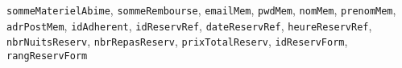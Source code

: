 \documentclass[12pt, a4paper]{article}
\newcommand\att[1]{\textnhtt{#1}}
\begin{document}
\att{sommeMaterielAbime},
\att{sommeRembourse},
\att{emailMem}, %
\att{pwdMem}, %
\att{nomMem}, %
\att{prenomMem}, %
\att{adrPostMem}, %
\att{idAdherent}, %
\att{idReservRef}, %
\att{dateReservRef}, %
\att{heureReservRef}, %
\att{nbrNuitsReserv}, %
\att{nbrRepasReserv}, %
\att{prixTotalReserv}, %
\att{idReservForm}, %
\att{rangReservForm} %
\end{document}

